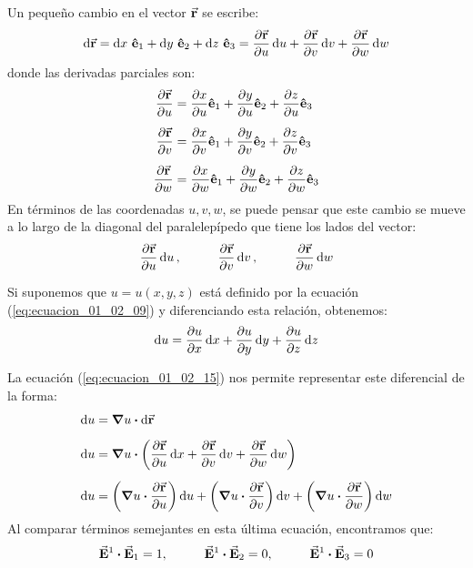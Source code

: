 \documentclass[hidelinks,12pt]{article}
\begin{document}
Un pequeño cambio en el vector $\va{r}$ se escribe:
\begin{align}
\dd{\va{r}} = \dd{x} \, \vu{e}_{1} + \dd{y} \, \vu{e}_{2} + \dd{z} \, \vu{e}_{3} = \pdv{\va{r}}{u} \dd{u} + \pdv{\va{r}}{v} \dd{v} + \pdv{\va{r}}{w} \dd{w}
\label{eq:ecuacion_01_02_15} 
\end{align}
donde las derivadas parciales son:
\begin{align}
\begin{aligned}
\pdv{\va{r}}{u} &= \pdv{x}{u} \vu{e}_{1} + \pdv{y}{u} \vu{e}_{2} + \pdv{z}{u} \vu{e}_{3} \\[0.5em] 
\pdv{\va{r}}{v} &= \pdv{x}{v} \vu{e}_{1} + \pdv{y}{v} \vu{e}_{2} + \pdv{z}{v} \vu{e}_{3} \\[0.5em]
\pdv{\va{r}}{w} &= \pdv{x}{w} \vu{e}_{1} + \pdv{y}{w} \vu{e}_{2} + \pdv{z}{w} \vu{e}_{3}
\end{aligned}
\label{eq:ecuacion_01_02_16}
\end{align}
En términos de las coordenadas $u, v, w$, se puede pensar que este cambio se mueve a lo largo de la diagonal del paralelepípedo que tiene los lados del vector:
\begin{align*}
\pdv{\va{r}}{u} \dd{u}, \hspace{1cm} \pdv{\va{r}}{v} \dd{v}, \hspace{1cm} \pdv{\va{r}}{w} \dd{w}
\end{align*}

Si suponemos que $u = u(x, y, z)$ está definido por la ecuación (\ref{eq:ecuacion_01_02_09}) y diferenciando esta relación, obtenemos:
\begin{align}
\dd{u} = \pdv{u}{x} \dd{x} + \pdv{u}{y} \dd{y} + \pdv{u}{z} \dd{z}
\label{eq:ecuacion_01_02_17}
\end{align}

La ecuación (\ref{eq:ecuacion_01_02_15}) nos permite representar este diferencial de la forma:
\begin{align}
\begin{aligned}
\dd{u} &= \grad{u} \vdot \dd{\va{r}} \\[0.5em]
\dd{u} &= \grad{u} \vdot \left( \pdv{\va{r}}{u} \dd{x} + \pdv{\va{r}}{v} \dd{v} + \pdv{\va{r}}{w} \dd{w} \right) \\[0.5em]
\dd{u} &= \left( \grad{u} \vdot \pdv{\va{r}}{u} \right) \dd{u} + \left( \grad{u} \vdot \pdv{\va{r}}{v} \right) \dd{v} + \left( \grad{u} \vdot \pdv{\va{r}}{w} \right) \dd{w}
\end{aligned}
\label{eq:ecuacion_01_02_18}
\end{align}
Al comparar términos semejantes en esta última ecuación, encontramos que:
\begin{align}
\va{E}^{1} \vdot \va{E}_{1} = 1, \hspace{1cm} \va{E}^{1} \vdot \va{E}_{2} = 0, \hspace{1cm} \va{E}^{1} \vdot \va{E}_{3} = 0
\label{eq:ecuacion_01_02_19}
\end{align}
\end{document}
